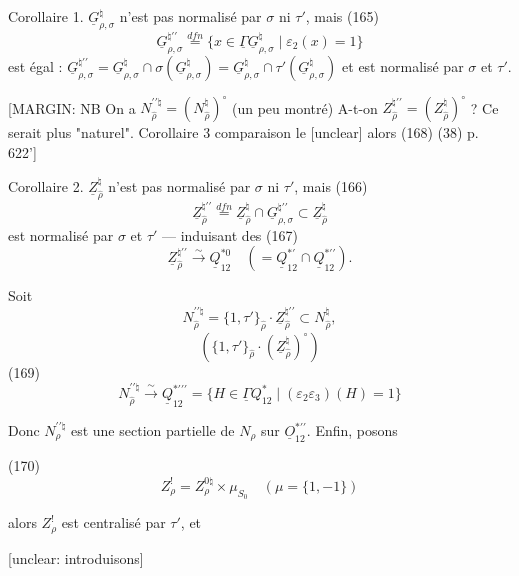 Corollaire 1. $\underline{G}_{\rho,\sigma}^\natural$ n'est pas normalisé par $\sigma$ ni $\tau'$,
mais
(165) $$ \underline{G}_{\rho,\sigma}^{\natural \prime\prime} \overset{dfn}{=} \{ x \in \underline{\Gamma} \underline{G}_{\rho,\sigma}^\natural \mid \varepsilon_2(x) = 1 \} $$
est égal : $\underline{G}_{\rho,\sigma}^{\natural \prime\prime} = \underline{G}_{\rho,\sigma}^\natural \cap \sigma(\underline{G}_{\rho,\sigma}^\natural) = \underline{G}_{\rho,\sigma}^\natural \cap \tau'(\underline{G}_{\rho,\sigma}^\natural)$
et est normalisé par $\sigma$ et $\tau'$.

[MARGIN: NB On a $N_{\hat{\rho}}^{\prime\prime \natural} = (N_{\hat{\rho}}^\natural)^\circ$ (un peu montré) A-t-on $Z_{\hat{\rho}}^{\natural \prime\prime} = (Z_{\hat{\rho}}^\natural)^\circ$ ? Ce serait plus "naturel".
Corollaire 3
comparaison le [unclear] alors (168) (38) p. 622']

Corollaire 2. $\underline{Z}_{\hat{\rho}}^\natural$ n'est pas normalisé par
$\sigma$ ni $\tau'$, mais
(166) $$ \underline{Z}_{\hat{\rho}}^{\natural \prime\prime} \overset{dfn}{=} \underline{Z}_{\hat{\rho}}^\natural \cap \underline{G}_{\rho,\sigma}^{\natural \prime\prime} \subset \underline{Z}_{\hat{\rho}}^\natural $$
est normalisé par $\sigma$ et $\tau'$ — induisant des
(167) $$ \underline{Z}_{\hat{\rho}}^{\natural \prime\prime} \overset{\sim}{\to} \underline{Q}_{12}^{* 0} \quad (= \underline{Q}_{12}^{* \prime} \cap \underline{Q}_{12}^{* \prime\prime}). $$

Soit
$$ N_{\hat{\rho}}^{\prime\prime \natural} = \{1, \tau'\}_{\hat{\rho}} \cdot \underline{Z}_{\hat{\rho}}^{\natural \prime\prime} \subset N_{\hat{\rho}}^\natural , $$
$$ ( \{1, \tau'\}_{\hat{\rho}} \cdot (\underline{Z}_{\hat{\rho}}^\natural)^\circ ) $$
(169) $$ N_{\hat{\rho}}^{\prime\prime \natural} \overset{\sim}{\to} \underline{Q}_{12}^{* \prime\prime\prime} = \{ H \in \underline{\Gamma} Q_{12}^* \mid (\varepsilon_2 \varepsilon_3)(H) = 1 \} $$

\newpage


Donc $N_{\rho}^{\prime\prime \natural}$ est une section partielle de $N_{\rho}$
sur $\underline{O}_{12}^{*\prime\prime}$. Enfin, posons

(170) $$Z_{\rho}^{!} = Z_{\rho}^{0 \natural} \times \mu_{S_0} \quad (\mu = \{1, -1\})$$

alors $Z_{\rho}^{!}$ est centralisé par $\tau'$, et

[unclear: introduisons]

